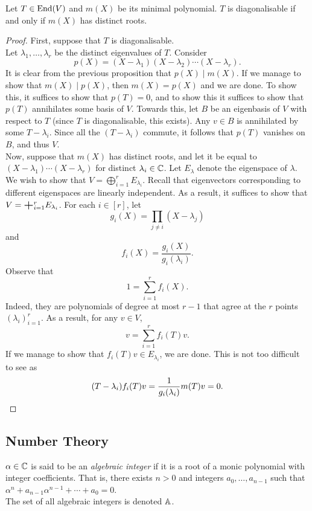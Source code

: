 		\begin{ftheo}
			\label{diagonalisable iff min poly has distinct roots}
			Let $T \in \operatorname{End}(V)$ and $m(X)$ be its minimal polynomial. $T$ is diagonalisable if and only if $m(X)$ has distinct roots.
		\end{ftheo}
		\begin{proof}
			First, suppose that $T$ is diagonalisable.\\
			Let $\lambda_1,\ldots,\lambda_r$ be the distinct eigenvalues of $T$. Consider
			\[ p(X) = (X - \lambda_1) (X - \lambda_2) \cdots (X - \lambda_r). \]
			It is clear from the previous proposition that $p(X) \mid m(X)$. If we manage to show that $m(X) \mid p(X)$, then $m(X) = p(X)$ and we are done. To show this, it suffices to show that $p(T) = 0$, and to show this it suffices to show that $p(T)$ annihilates some basis of $V$. Towards this, let $B$ be an eigenbasis of $V$ with respect to $T$ (since $T$ is diagonalisable, this exists). Any $v \in B$ is annihilated by some $T - \lambda_i$. Since all the $(T-\lambda_i)$ commute, it follows that $p(T)$ vanishes on $B$, and thus $V$.\\

			Now, suppose that $m(X)$ has distinct roots, and let it be equal to $(X-\lambda_1) \cdots (X-\lambda_r)$ for distinct $\lambda_i \in \mathbb{C}$. Let $E_\lambda$ denote the eigenspace of $\lambda$. We wish to show that $V = \bigoplus_{i=1}^r E_{\lambda_i}$. Recall that eigenvectors corresponding to different eigenspaces are linearly independent. As a result, it suffices to show that $V = \bigplus_{i=1}^r E_{\lambda_i}$. For each $i \in [r]$, let
			\[ g_i(X) = \prod_{j \ne i} (X - \lambda_j) \]
			and
			\[ f_i(X) = \frac{g_i(X)}{g_i(\lambda_i)}. \]
			Observe that
			\[ 1 = \sum_{i=1}^r f_i(X). \]
			Indeed, they are polynomials of degree at most $r-1$ that agree at the $r$ points $(\lambda_i)_{i=1}^r$. As a result, for any $v \in V$,
			\[ v = \sum_{i=1}^r f_i(T)v. \]
			If we manage to show that $f_i(T)v \in E_{\lambda_i}$, we are done.
			This is not too difficult to see as
			\[ (T - \lambda_i) f_i(T)v = \frac{1}{g_i(\lambda_i)} m(T) v = 0. \qedhere \]
		\end{proof}

	\subsection{Number Theory}


		\begin{fdef}
			\label{def: algebraic integer}
			$\alpha \in \mathbb{C}$ is said to be an \emph{algebraic integer} if it is a root of a monic polynomial with integer coefficients. That is, there exists $n > 0$ and integers $a_0,\ldots,a_{n-1}$ such that $\alpha^n + a_{n-1}\alpha^{n-1} + \cdots + a_0 = 0$.\\
			The set of all algebraic integers is denoted $\mathbb{A}$.
		\end{fdef}

